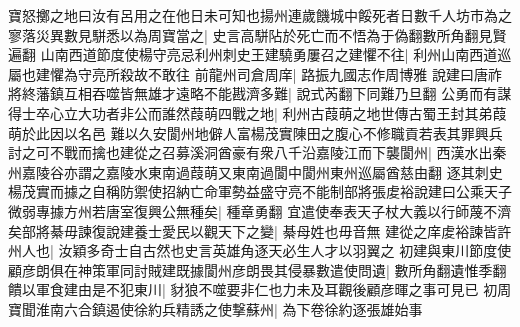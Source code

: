 寶怒擲之地曰汝有呂用之在他日未可知也揚州連歲饑城中餒死者日數千人坊市為之寥落災異數見駢悉以為周寶當之|{
	史言高駢阽於死亡而不悟為于偽翻數所角翻見賢遍翻}
山南西道節度使楊守亮忌利州刺史王建驍勇屢召之建懼不往|{
	利州山南西道巡屬也建懼為守亮所殺故不敢往}
前龍州司倉周庠|{
	路振九國志作周博雅}
說建曰唐祚將終藩鎮互相吞噬皆無雄才遠略不能戡濟多難|{
	說式芮翻下同難乃旦翻}
公勇而有謀得士卒心立大功者非公而誰然葭萌四戰之地|{
	利州古葭萌之地世傳古蜀王封其弟葭萌於此因以名邑}
難以久安閬州地僻人富楊茂實陳田之腹心不修職貢若表其罪興兵討之可不戰而擒也建從之召募溪洞酋豪有衆八千沿嘉陵江而下襲閬州|{
	西漢水出秦州嘉陵谷亦謂之嘉陵水東南過葭萌又東南過閬中閬州東州巡屬酋慈由翻}
逐其刺史楊茂實而據之自稱防禦使招納亡命軍勢益盛守亮不能制部將張䖍裕說建曰公乘天子微弱專據方州若唐室復興公無種矣|{
	種章勇翻}
宜遣使奉表天子杖大義以行師蔑不濟矣部將綦毋諫復說建養士愛民以觀天下之變|{
	綦母姓也毋音無}
建從之庠䖍裕諫皆許州人也|{
	汝穎多奇士自古然也史言英雄角逐天必生人才以羽翼之}
初建與東川節度使顧彦朗俱在神策軍同討賊建既據閬州彦朗畏其侵暴數遣使問遺|{
	數所角翻遺惟季翻}
饋以軍食建由是不犯東川|{
	豺狼不噬要非仁也力未及耳觀後顧彦暉之事可見已}
初周寶聞淮南六合鎮遏使徐約兵精誘之使撃蘇州|{
	為下卷徐約逐張雄始事}


